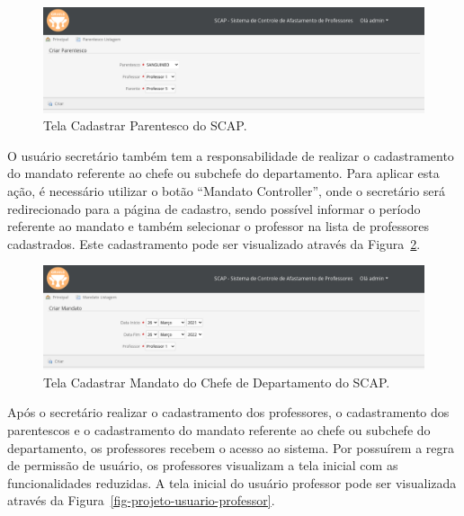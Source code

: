 \begin{figure}[!h]
	\centering
	\includegraphics[scale=0.33]{figuras/fig-projeto-cadastrar-parentesco} 
	\caption{Tela Cadastrar Parentesco do SCAP.}
	\label{fig-projeto-cadastrar-parentesco}
\end{figure}

O usuário secretário também tem a responsabilidade de realizar o cadastramento do mandato referente ao chefe ou subchefe do departamento. Para aplicar esta ação, é necessário utilizar o botão ``Mandato Controller'', onde o secretário será redirecionado para a página de cadastro, sendo possível informar o período referente ao mandato e também selecionar o professor na lista de professores cadastrados. Este cadastramento pode ser visualizado através da Figura~\ref{fig-projeto-cadastrar-mandato}. 

\begin{figure}[!h]
	\centering
	\includegraphics[scale=0.33]{figuras/fig-projeto-cadastrar-mandato} 
	\caption{Tela Cadastrar Mandato do Chefe de Departamento do SCAP.}
	\label{fig-projeto-cadastrar-mandato}
\end{figure}

Após o secretário realizar o cadastramento dos professores, o cadastramento dos parentescos e o cadastramento do mandato referente ao chefe ou subchefe do departamento, os professores recebem o acesso ao sistema. Por possuírem a regra de permissão de usuário, os professores visualizam a tela inicial com as funcionalidades reduzidas. A tela inicial do usuário professor pode ser visualizada através da Figura~\ref{fig-projeto-usuario-professor}. 

